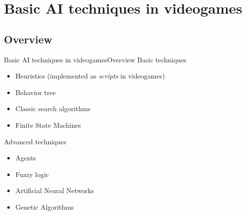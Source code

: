\documentclass[10pt,compress]{beamer} %
\begin{document}
\section{Basic AI techniques in videogames}
\subsection{Overview}
\begin{frame}{Basic AI techniques in videogames}{Overview}
	Basic techniques
 	\begin{itemize}
 		\item Heuristics (implemented as \textit{scripts} in videogames)
        \item Behavior tree 
 		\item Classic search algorithms
		\item Finite State Machines
 	\end{itemize}
	
	Advanced techniques
 	\begin{itemize}
 		\item Agents
		\item Fuzzy logic
		\item Artificial Neural Networks
		\item Genetic Algorithms
 	\end{itemize}
\end{frame}
\end{document}
